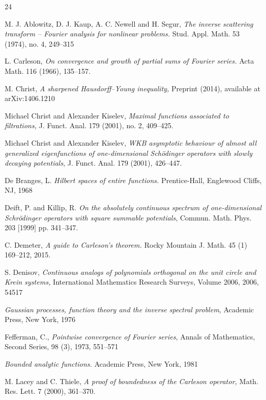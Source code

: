 \documentclass[11pt,twoside,reqno]{amsart}
\theoremstyle{plain}
\numberwithin{equation}{section}
\begin{document}
\begin{thebibliography}{24}


 {\sc M. J. Ablowitz, D. J. Kaup, A. C. Newell and H. Segur,} {\it The inverse scattering transform -- Fourier analysis
for nonlinear problems.} Stud. Appl. Math. 53 (1974), no. 4, 249--315

 {\sc L. Carleson,} {\it  On convergence and growth of partial sums of Fourier series.} Acta Math. 116 (1966), 135--157.


 {\sc M. Christ,} {\it A sharpened Hausdorff--Young inequality,}  Preprint (2014), available at arXiv:1406.1210

 {\sc Michael Christ and Alexander Kiselev,} {\it  Maximal functions associated to filtrations,} J. Funct. Anal. 179 (2001), no. 2, 409--425.


 {\sc Michael Christ and Alexander Kiselev,} {\it WKB asymptotic behaviour of almost all generalized eigenfunctions of one-dimensional Sch\"odinger operators with slowly decaying potentials}, J. Funct. Anal. 179
(2001), 426--447.

      {\sc De Branges, L.} {\it Hilbert spaces of entire functions.} Prentice-Hall,
Englewood Cliffs, NJ, 1968


 {\sc Deift, P. and Killip, R.} {\it On the absolutely continuous spectrum of one-dimensional Schr\"odinger operators with square summable potentials}, Commun. Math. Phys. 203 [1999] pp. 341--347.

 {\sc C. Demeter,} {\it A guide to Carleson's theorem.} Rocky Mountain J. Math. 45 (1) 169--212, 2015.

 {\sc S. Denisov}, {\it Continuous analogs of polynomials orthogonal on the unit circle and Krein systems,}
International Mathematics Research Surveys, Volume 2006, 2006, 54517

 {\it Gaussian processes, function theory and the inverse spectral problem},
Academic Press, New York,  1976

 {\sc Fefferman, C.,} {\it Pointwise convergence of Fourier series}, Annals of Mathematics, Second Series, 98 (3), 1973, 551--571

 {\it Bounded analytic functions.} Academic Press, New York, 1981


 {\sc M. Lacey and C. Thiele,} {\it  A proof of boundedness of the Carleson operator,}
Math. Res. Lett. 7 (2000), 361--370.


\end{thebibliography}
\end{document}
